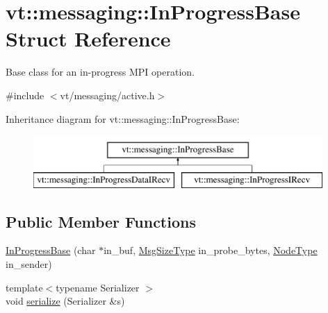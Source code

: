 \hypertarget{structvt_1_1messaging_1_1_in_progress_base}{}\section{vt\+:\+:messaging\+:\+:In\+Progress\+Base Struct Reference}
\label{structvt_1_1messaging_1_1_in_progress_base}


Base class for an in-\/progress M\+PI operation.  




{\ttfamily \#include $<$vt/messaging/active.\+h$>$}

Inheritance diagram for vt\+:\+:messaging\+:\+:In\+Progress\+Base\+:\begin{figure}[H]
\begin{center}
\leavevmode
\includegraphics[height=2.000000cm]{structvt_1_1messaging_1_1_in_progress_base}
\end{center}
\end{figure}
\subsection*{Public Member Functions}
\begin{DoxyCompactItemize}
\item 
\hyperlink{structvt_1_1messaging_1_1_in_progress_base_a76a5651bf56a3ed12ea800aa5b16cf22}{In\+Progress\+Base} (char $\ast$in\+\_\+buf, \hyperlink{namespacevt_a408e86a8c7c89309b52907dc5a513924}{Msg\+Size\+Type} in\+\_\+probe\+\_\+bytes, \hyperlink{namespacevt_a866da9d0efc19c0a1ce79e9e492f47e2}{Node\+Type} in\+\_\+sender)
\item 
{\footnotesize template$<$typename Serializer $>$ }\\void \hyperlink{structvt_1_1messaging_1_1_in_progress_base_afa9023f2c85ac14ef3b35ac71e8a477e}{serialize} (Serializer \&s)
\end{DoxyCompactItemize}
